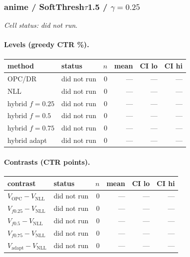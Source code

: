 \documentclass[10pt,a4paper]{article}
\begin{document}
\subsubsection{anime / SoftThresh$\tau$1.5 / $\gamma=0.25$}
\emph{Cell status: did not run}.
\paragraph{Levels (greedy CTR \%).}
{\centering\small\begin{tabular}{llrrrr}
\toprule method & status & $n$ & mean & CI lo & CI hi \\
\midrule
OPC/DR & did not run & 0 & --- & --- & --- \\
NLL & did not run & 0 & --- & --- & --- \\
hybrid $f{=}0.25$ & did not run & 0 & --- & --- & --- \\
hybrid $f{=}0.5$ & did not run & 0 & --- & --- & --- \\
hybrid $f{=}0.75$ & did not run & 0 & --- & --- & --- \\
hybrid adapt & did not run & 0 & --- & --- & --- \\
\bottomrule\end{tabular}\par}
\paragraph{Contrasts (CTR points).}
{\centering\small\begin{tabular}{llrrrr}
\toprule contrast & status & $n$ & mean & CI lo & CI hi \\
\midrule
$V_{\mathrm{OPC}}-V_{\mathrm{NLL}}$ & did not run & 0 & --- & --- & --- \\
$V_{f0.25}-V_{\mathrm{NLL}}$ & did not run & 0 & --- & --- & --- \\
$V_{f0.5}-V_{\mathrm{NLL}}$ & did not run & 0 & --- & --- & --- \\
$V_{f0.75}-V_{\mathrm{NLL}}$ & did not run & 0 & --- & --- & --- \\
$V_{\mathrm{adapt}}-V_{\mathrm{NLL}}$ & did not run & 0 & --- & --- & --- \\
\bottomrule\end{tabular}\par}
\end{document}

